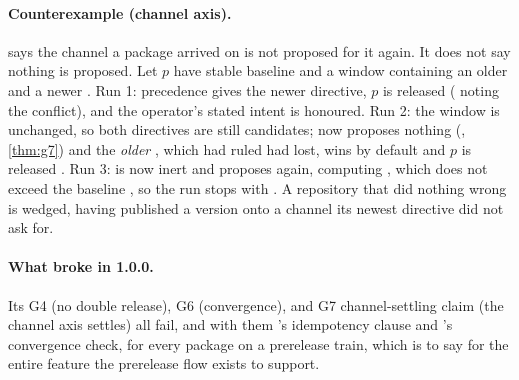 \paragraph{Counterexample (channel axis).}
 says the channel a package arrived on is not proposed for it
again. It does not say nothing is proposed. Let $p$ have stable baseline
 and a window containing an older  and a
newer . Run 1:  precedence gives the newer
directive, $p$ is released  ( noting the
conflict), and the operator's stated intent is honoured. Run 2: the window is
unchanged, so both directives are still candidates;  now proposes
nothing (, \cref{thm:g7}) and the \emph{older} ,
which  had ruled had lost, wins by default and $p$ is released
. Run 3:  is now inert and  proposes
 again, computing , which does not exceed the
baseline , so the run stops with . A repository
that did nothing wrong is wedged, having published a version onto a channel its
newest directive did not ask for.

\paragraph{What broke in 1.0.0.} Its G4 (no double release), G6 (convergence), and G7 channel-settling claim (the channel axis settles) all fail, and with
them 's idempotency clause and
's convergence check, for every package on a prerelease train,
which is to say for the entire feature the prerelease flow exists to support.

